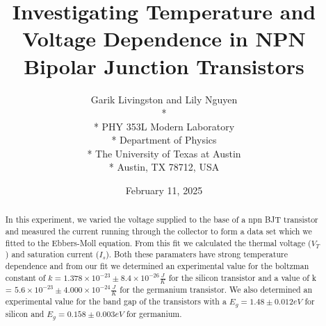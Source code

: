 \documentclass[12pt,letterpaper,onecolumn]{article}
\begin{document}

\title{Investigating Temperature and Voltage Dependence in NPN Bipolar Junction Transistors}

\author{
 Garik Livingston and Lily Nguyen \\*
  \\*
 PHY 353L Modern Laboratory \\*
 Department of Physics \\*
 The University of Texas at Austin \\*
 Austin, TX 78712, USA
}
\date{February 11, 2025}


\maketitle


\begin{abstract}
	In this experiment, we varied the voltage supplied to the base of a npn BJT transistor and measured the current running through the collector to form a data set which we fitted to the Ebbers-Moll equation.
	From this fit we calculated the thermal voltage ($V_T$) and saturation current ($I_s$). Both these paramaters have strong temperature dependence and from our fit we determined an experimental value for the boltzman constant of $k = 1.378 \times 10^{-23} \pm 8.4 \times 10^{-26} \frac{J}{K}$ for the silicon transistor and a value of k = $5.6 \times 10^{-23}\pm 4.000 \times 10^{-24} \frac{J}{K}$ for the germanium transistor. 
	We also determined an experimental value for the band gap of the transistors with a $E_g = 1.48 \pm 0.012eV$ for silicon and  $E_g = 0.158 \pm 0.003 eV$ for germanium.
	
\end{abstract}

\end{document}
